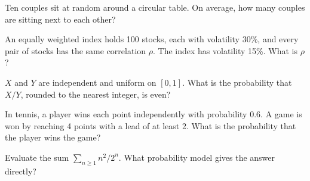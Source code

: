 \begin{question}\label{iq:iv1:timed-test-2:8}
Ten couples sit at random around a circular table. On average, how many couples are sitting next to each other?
\end{question}

\begin{question}\label{iq:iv1:timed-test-2:9}
An equally weighted index holds 100 stocks, each with volatility 30\%, and every pair of stocks has the same correlation $\rho$. The index has volatility 15\%. What is $\rho$?
\end{question}

\begin{question}\label{iq:iv1:timed-test-2:10}
$X$ and $Y$ are independent and uniform on $[0, 1]$. What is the probability that $X/Y$, rounded to the nearest integer, is even?
\end{question}

\begin{question}\label{iq:iv1:timed-test-2:11}
In tennis, a player wins each point independently with probability $0.6$. A game is won by reaching 4 points with a lead of at least 2. What is the probability that the player wins the game?
\end{question}

\begin{question}\label{iq:iv1:timed-test-2:12}
Evaluate the sum $\sum_{n \ge 1}n^2/2^n$. What probability model gives the answer directly?
\end{question}
